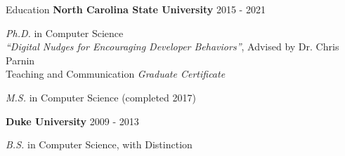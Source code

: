 \documentclass{resume} %
\begin{document}
\vspace{-14pt}
\begin{rSection}{Education}
\vspace{-4pt}
{\bf North Carolina State University} \hfill {2015 - 2021} 

\vspace{-9pt}
\textit{Ph.D.} in Computer Science \\
\textit{``Digital Nudges for Encouraging Developer Behaviors''}, Advised by Dr. Chris Parnin  \\
\vspace{-8pt}
Teaching and Communication \textit{Graduate Certificate} \\
\vspace{-12pt}

\textit{M.S.} in Computer Science (completed 2017) \\
\vspace{-20pt}

{\bf Duke University} \hfill {2009 - 2013}

\vspace{-8pt}
\textit{B.S.} in Computer Science, with Distinction
\end{rSection}
\vspace{-12pt}
\end{document}
